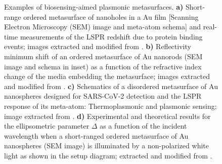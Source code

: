 \begin{figure}[h!]
\centering
\hspace*{-3.5em}%
  \vspace*{-1.75em}
  \caption[Backgrounds]{Examples of biosensing-aimed plasmonic metasurfaces. \textbf{a)} Short-range ordered metasurface of nanoholes in a Au film [Scanning Electron Microscopy (SEM) image and meta-atom schema] and real-time measurements of the LSPR redshift due to protein binding events; images extracted and modified from \cite{feuz_improving_2010}. \textbf{b) } Reflectivity minimum shift of an ordered metasurface of Au nanorods (SEM image and schema in inset) as a function of the refractive index change of the media embedding the metasurface; images extracted and modified from \cite{kabashin_plasmonic_2009}. \textbf{c)} Schematics of a disordered metasurface of Au nanospheres designed for SARS-CoV-2 detection and the LSPR response of its meta-atom: Thermoplasmonic and plasmonic sensing; image extracted from \cite{qiu_dual_2020}. \textbf{d)} Experimental and theoretical results for the ellipsometric parameter $\Delta$ as a function of the incident wavelength when a short-ranged ordered metasurface of Au nanospheres (SEM image) is illuminated by a  non-polarized white light as shown in the setup diagram; extracted and modified from \cite{svedendahl_refractometric_2014}.
  }
\label{fig:Back}
\end{figure}

